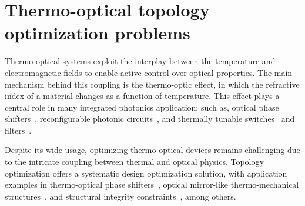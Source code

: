 \chapter{Thermo-optical topology optimization problems}\label{chap:to}
Thermo-optical systems exploit the interplay between the temperature and electromagnetic fields to enable active control over optical properties. 
The main mechanism behind this coupling is the thermo-optic effect, 
in which the refractive index of a material changes as a function of temperature. 
This effect plays a central role in many integrated photonics application; such as,
 optical phase shifters~\cite{TOPS_1, TOPS_2, TOPS_3}, reconfigurable photonic circuits~\cite{program, PIC}, and thermally tunable switches~\cite{switch, switch_2} and filters~\cite{filter}.

 Despite its wide usage, optimizing thermo-optical devices remains challenging due to the intricate coupling 
 between thermal and optical physics. Topology optimization offers a systematic design optimization solution, with application examples in
  thermo-optical phase shifters~\cite{TOPS_heat, ownpub0}, optical mirror-like thermo-mechanical structures~\cite{opt_perf}, and
structural integrity constraints~\cite{structural_heat}, among others.

